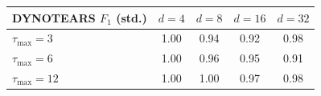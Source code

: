\begin{tabular}{lcccc}
\toprule
DYNOTEARS $F_1$ (std.) & $d{=}4$ & $d{=}8$ & $d{=}16$ & $d{=}32$ \\
\midrule
$\tau_{\max}{=}3$ & 1.00 & 0.94 & 0.92 & 0.98 \\
$\tau_{\max}{=}6$ & 1.00 & 0.96 & 0.95 & 0.91 \\
$\tau_{\max}{=}12$ & 1.00 & 1.00 & 0.97 & 0.98 \\
\bottomrule
\end{tabular}
